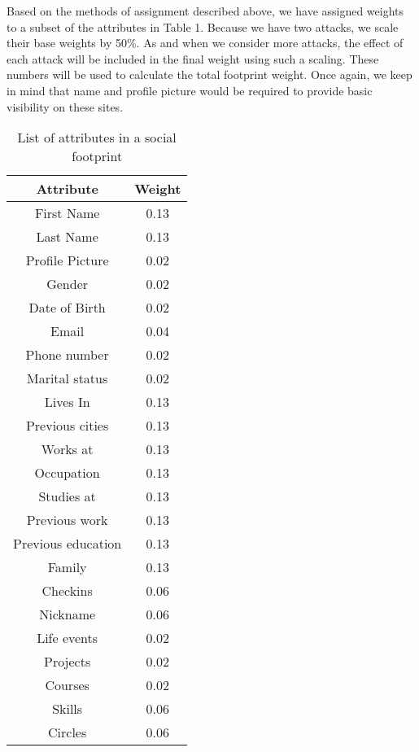 \documentclass[10pt,conference]{IEEEtran}
\begin{document}
Based on the methods of assignment described above, we have assigned weights to a subset of the attributes in Table 1. Because we have two attacks, we scale their base weights by 50\%. As and when we consider more attacks, the effect of each attack will be included in the final weight using such a scaling. These numbers will be used to calculate the total footprint weight. Once again, we keep in mind that name and profile picture would be required to provide basic visibility on these sites. 

\begin{table}
	\normalsize
	\centering
 		\begin{tabular}{|| c | c ||} 
 		\hline
 		Attribute & Weight \\  
		\hline\hline
		First Name &  0.13 \\
		\hline
		Last Name &  0.13 \\
		\hline
		Profile Picture & 0.02 \\
		\hline
		Gender &  0.02 \\
		\hline
		Date of Birth &  0.02\\
		\hline
		Email &  0.04 \\
		\hline
		Phone number &  0.02\\
		\hline
		Marital status &  0.02\\
		\hline
		Lives In &  0.13\\
		\hline
		Previous cities &  0.13\\
		\hline
		Works at &  0.13\\
		\hline
		Occupation &  0.13\\
		\hline
		Studies at &  0.13\\
		\hline
		Previous work &  0.13\\
		\hline
		Previous education & 0.13 \\
		\hline
		Family &  0.13\\
		\hline
		Checkins &  0.06\\
		\hline
		Nickname & 0.06 \\
		\hline
		Life events & 0.02 \\
		\hline
		Projects &  0.02 \\
		\hline
		Courses & 0.02 \\
		\hline
		Skills & 0.06 \\
		\hline		
		Circles & 0.06 \\
		\hline
	\end{tabular}
\caption{List of attributes in a social footprint}
\end{table}
\end{document}

